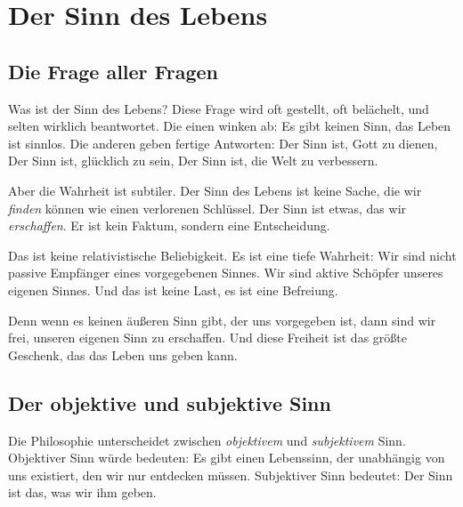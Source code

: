 
\chapter{Der Sinn des Lebens}

\section{Die Frage aller Fragen}

\glqq Was ist der Sinn des Lebens?\grqq{} Diese Frage wird oft gestellt, oft belächelt, und selten wirklich beantwortet. Die einen winken ab: \glqq Es gibt keinen Sinn, das Leben ist sinnlos.\grqq{} Die anderen geben fertige Antworten: \glqq Der Sinn ist, Gott zu dienen\grqq{}, \glqq Der Sinn ist, glücklich zu sein\grqq{}, \glqq Der Sinn ist, die Welt zu verbessern.\grqq{}

Aber die Wahrheit ist subtiler. Der Sinn des Lebens ist keine Sache, die wir \emph{finden} können wie einen verlorenen Schlüssel. Der Sinn ist etwas, das wir \emph{erschaffen}. Er ist kein Faktum, sondern eine Entscheidung.

Das ist keine relativistische Beliebigkeit. Es ist eine tiefe Wahrheit: Wir sind nicht passive Empfänger eines vorgegebenen Sinnes. Wir sind aktive Schöpfer unseres eigenen Sinnes. Und das ist keine Last, es ist eine Befreiung.

Denn wenn es keinen äußeren Sinn gibt, der uns vorgegeben ist, dann sind wir frei, unseren eigenen Sinn zu erschaffen. Und diese Freiheit ist das größte Geschenk, das das Leben uns geben kann.

\section{Der objektive und subjektive Sinn}

Die Philosophie unterscheidet zwischen \emph{objektivem} und \emph{subjektivem} Sinn. Objektiver Sinn würde bedeuten: Es gibt einen Lebenssinn, der unabhängig von uns existiert, den wir nur entdecken müssen. Subjektiver Sinn bedeutet: Der Sinn ist das, was wir ihm geben.

